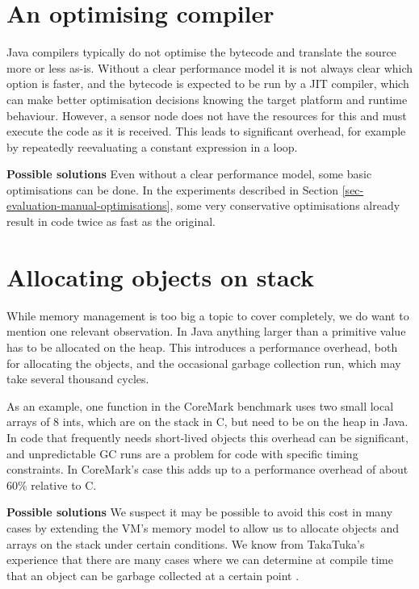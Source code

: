 \section{An optimising compiler}
\label{sec-optimising-javac}
Java compilers typically do not optimise the bytecode and translate the source more or less as-is. Without a clear performance model it is not always clear which option is faster, and the bytecode is expected to be run by a JIT compiler, which can make better optimisation decisions knowing the target platform and runtime behaviour. However, a sensor node does not have the resources for this and must execute the code as it is received. This leads to significant overhead, for example by repeatedly reevaluating a constant expression in a loop.

\textbf{Possible solutions}
Even without a clear performance model, some basic optimisations can be done. In the experiments described in Section \ref{sec-evaluation-manual-optimisations}, some very conservative optimisations already result in code twice as fast as the original.


\section{Allocating objects on stack}
\label{sec-no-gc}
While memory management is too big a topic to cover completely, we do want to mention one relevant observation. In Java anything larger than a primitive value has to be allocated on the heap. This introduces a performance overhead, both for allocating the objects, and the occasional garbage collection run, which may take several thousand cycles.

As an example, one function in the CoreMark benchmark uses two small local arrays of 8 ints, which are on the stack in C, but need to be on the heap in Java. In code that frequently needs short-lived objects this overhead can be significant, and unpredictable GC runs are a problem for code with specific timing constraints. In CoreMark's case this adds up to a performance overhead of about 60\% relative to C.

\textbf{Possible solutions}
We suspect it may be possible to avoid this cost in many cases by extending the VM's memory model to allow us to allocate objects and arrays on the stack under certain conditions. We know from TakaTuka's experience that there are many cases where we can determine at compile time that an object can be garbage collected at a certain point \cite{aslam2010optimized}.

